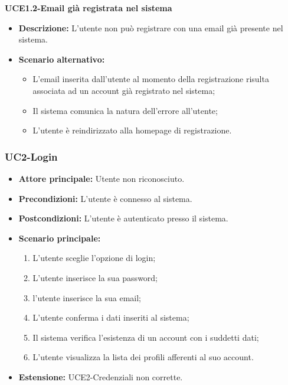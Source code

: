\textbf{UCE1.2-Email già registrata nel sistema}
\begin{itemize}
    \item \textbf{Descrizione: }L'utente non può registrare con una email già presente nel sistema.
    \item \textbf{Scenario alternativo:}
    \begin{itemize}
        \item L'email inserita dall'utente al momento della registrazione risulta associata ad un
        account già registrato nel sistema;
        \item Il sistema comunica la natura dell'errore all'utente;
        \item L'utente è reindirizzato alla homepage di registrazione.
    \end{itemize}
\end{itemize}
\break

\subsubsection{UC2-Login}
\begin{itemize}
\item \textbf{Attore principale:} Utente non riconosciuto.
\item \textbf{Precondizioni:} L'utente è connesso al sistema.
\item \textbf{Postcondizioni:} L'utente è autenticato presso il sistema.
\item \textbf{Scenario principale:}
\begin{enumerate}
    \item L'utente sceglie l'opzione di login;
    \item L'utente inserisce la sua password;
    \item l'utente inserisce la sua email;
    \item L'utente conferma i dati inseriti al sistema;
    \item Il sistema verifica l'esistenza di un account con i suddetti dati;
    \item L'utente visualizza la lista dei profili afferenti al suo account.
\end{enumerate}
    \item \textbf{Estensione: }UCE2-Credenziali non corrette.
\end{itemize}


